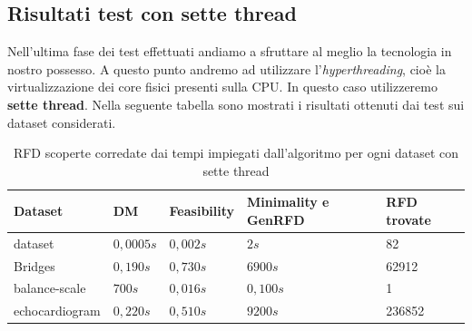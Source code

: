 \subsection{Risultati test con sette thread}
Nell'ultima fase dei test effettuati andiamo a sfruttare al meglio la tecnologia in nostro possesso.
A questo punto andremo ad utilizzare l'\emph{hyperthreading}, cioè la virtualizzazione dei core fisici presenti sulla CPU. In questo caso utilizzeremo \textbf{sette thread}.
Nella seguente tabella sono mostrati i risultati ottenuti dai test sui dataset considerati.
\begin{table}[H]
	\centering
	\begin{tabular}{lllll}
		Dataset & DM & Feasibility & Minimality e GenRFD & RFD trovate \\
		\hline
		dataset& $0,0005s$ & $0,002s$& $2s$  & 82 \\
		Bridges & $0,190s$  & $0,730s$ & $6900s$ & 62912 \\
		balance-scale  & $700s$  & $0,016s$ & $0,100s$ & 1\\
		echocardiogram  & $0,220s$  & $0,510s$ & $9200s$ & 236852\\
		\hline
	\end{tabular}
	\label{risultati_7_thread}
	\caption{RFD scoperte corredate dai tempi impiegati dall'algoritmo per ogni dataset con sette thread}
\end{table}

